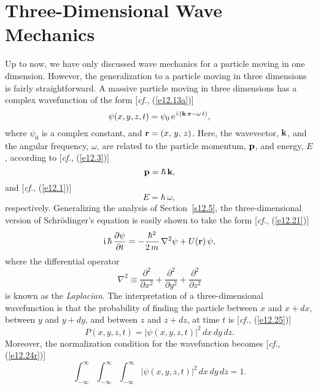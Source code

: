 \section{Three-Dimensional Wave Mechanics}
Up to now, we have only discussed wave mechanics for a particle moving in one dimension. However, the
generalization to a particle moving in three dimensions is fairly straightforward. 
 A massive particle moving in three dimensions
has a complex wavefunction of the form [{\em cf.}, (\ref{e12.13a})]
\begin{equation}
\psi(x,y,z,t) = \psi_0\,{\rm e}^{\,{\rm i}\,({\bf k}\cdot{\bf r}-\omega\,t)},
\end{equation}
where $\psi_0$ is a complex constant, and ${\bf r}= (x,\,y,\,z)$. Here, the wavevector, ${\bf k}$, and
the angular frequency, $\omega$, are related to the particle momentum, ${\bf p}$,  and energy, $E$, according
to [{\em cf.}, (\ref{e12.3})]
\begin{equation}
{\bf p} = \hbar\,{\bf k},
\end{equation}
and [{\em cf.}, (\ref{e12.1})]
\begin{equation}
E = \hbar\,\omega,
\end{equation}
 respectively. Generalizing the
analysis of Section~\ref{s12.5}, the three-dimensional version of Schr\"{o}dinger's
equation is easily shown to take the form [{\em cf.}, (\ref{e12.21})]
\begin{equation}\label{e12.78}
{\rm i}\,\hbar\,\frac{\partial\psi}{\partial t} = - \frac{\hbar^2}{2\,m}\,\nabla^2\psi + U({\bf r})\,\psi,
\end{equation}
where the differential operator
\begin{equation}
\nabla^2 \equiv \frac{\partial^2}{\partial x^2} + \frac{\partial^2 }{\partial y^2} + \frac{\partial^2}{\partial z^2}
\end{equation}
is known as the {\em Laplacian}. The interpretation of a three-dimensional wavefunction is that the
probability of finding the particle between $x$ and $x+dx$, between $y$ and $y+dy$, and
between $z$ and $z+dz$, at time $t$ is [{\em cf.}, (\ref{e12.25})]
\begin{equation}
P(x,y,z,t) = |\psi(x,y,z,t)|^2\,dx\,dy\,dz.
\end{equation}
Moreover, the normalization condition for the wavefunction becomes [{\em cf.}, (\ref{e12.24r})]
\begin{equation}\label{e12.81}
\int_{-\infty}^\infty\int_{-\infty}^\infty\int_{-\infty}^\infty|\psi(x,y,z,t)|^2\,dx\,dy\,dz =1.
\end{equation}
